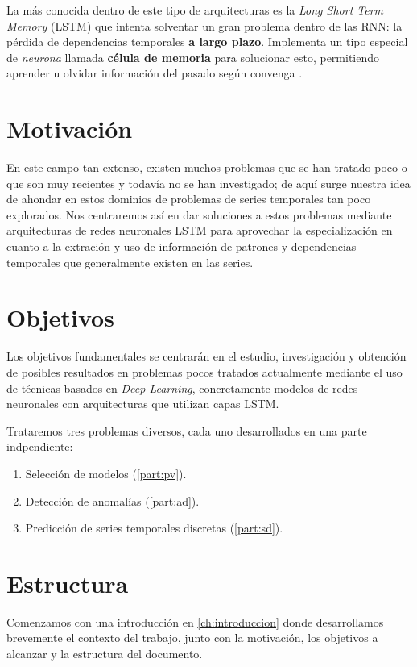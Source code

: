 La más conocida dentro de este tipo de arquitecturas es la \emph{Long Short Term Memory} (LSTM) \cite{hochreiter1997long} que intenta solventar un gran problema dentro de las RNN: la pérdida de dependencias temporales \textbf{a largo plazo}. Implementa un tipo especial de \emph{neurona} llamada \textbf{célula de memoria} para solucionar esto, permitiendo aprender u olvidar información del pasado según convenga \cite{wang2017origin}.

\section{Motivación}

En este campo tan extenso, existen muchos problemas que se han tratado poco o que son muy recientes y todavía no se han investigado; de aquí surge nuestra idea de ahondar en estos dominios de problemas de series temporales tan poco explorados. Nos centraremos así en dar soluciones a estos problemas mediante arquitecturas de redes neuronales LSTM para aprovechar la especialización en cuanto a la extración y uso de información de patrones y dependencias temporales que generalmente existen en las series.

\section{Objetivos}

Los objetivos fundamentales se centrarán en el estudio, investigación y obtención de posibles resultados en problemas pocos tratados actualmente mediante el uso de técnicas basados en \emph{Deep Learning}, concretamente modelos de redes neuronales con arquitecturas que utilizan capas LSTM.

Trataremos tres problemas diversos, cada uno desarrollados en una parte indpendiente:

\begin{enumerate}
  \item Selección de modelos (\autoref{part:pv}).
  \item Detección de anomalías (\autoref{part:ad}).
  \item Predicción de series temporales discretas (\autoref{part:sd}).
\end{enumerate}

\section{Estructura}

Comenzamos con una introducción en \autoref{ch:introduccion} donde desarrollamos brevemente el contexto del trabajo, junto con la motivación, los objetivos a alcanzar y la estructura del documento.

